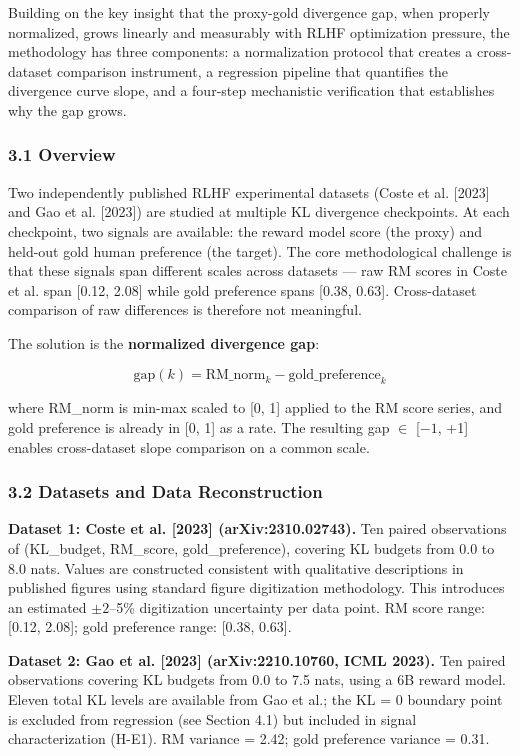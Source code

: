 
Building on the key insight that the proxy-gold divergence gap, when properly normalized, grows linearly and measurably with RLHF optimization pressure, the methodology has three components: a normalization protocol that creates a cross-dataset comparison instrument, a regression pipeline that quantifies the divergence curve slope, and a four-step mechanistic verification that establishes why the gap grows.

\subsubsection{3.1 Overview}

Two independently published RLHF experimental datasets (Coste et al. [2023] and Gao et al. [2023]) are studied at multiple KL divergence checkpoints. At each checkpoint, two signals are available: the reward model score (the proxy) and held-out gold human preference (the target). The core methodological challenge is that these signals span different scales across datasets --- raw RM scores in Coste et al. span [0.12, 2.08] while gold preference spans [0.38, 0.63]. Cross-dataset comparison of raw differences is therefore not meaningful.

The solution is the \textbf{normalized divergence gap}:

$$\text{gap}(k) = \text{RM\_norm}_k - \text{gold\_preference}_k$$

where RM\_norm is min-max scaled to [0, 1] applied to the RM score series, and gold preference is already in [0, 1] as a rate. The resulting gap $\in$ [$-1$, +1] enables cross-dataset slope comparison on a common scale.

\subsubsection{3.2 Datasets and Data Reconstruction}

\textbf{Dataset 1: Coste et al. [2023] (arXiv:2310.02743).} Ten paired observations of (KL\_budget, RM\_score, gold\_preference), covering KL budgets from 0.0 to 8.0 nats. Values are constructed consistent with qualitative descriptions in published figures using standard figure digitization methodology. This introduces an estimated $\pm 2$--5\% digitization uncertainty per data point. RM score range: [0.12, 2.08]; gold preference range: [0.38, 0.63].

\textbf{Dataset 2: Gao et al. [2023] (arXiv:2210.10760, ICML 2023).} Ten paired observations covering KL budgets from 0.0 to 7.5 nats, using a 6B reward model. Eleven total KL levels are available from Gao et al.; the KL = 0 boundary point is excluded from regression (see Section 4.1) but included in signal characterization (H-E1). RM variance = 2.42; gold preference variance = 0.31.

